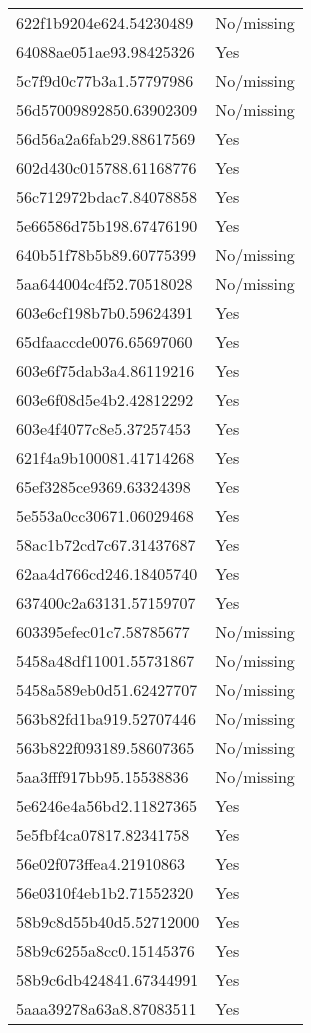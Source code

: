 \begin{tabular}{ll}
622f1b9204e624.54230489 & No/missing \\
64088ae051ae93.98425326 & Yes \\
5c7f9d0c77b3a1.57797986 & No/missing \\
56d57009892850.63902309 & No/missing \\
56d56a2a6fab29.88617569 & Yes \\
602d430c015788.61168776 & Yes \\
56c712972bdac7.84078858 & Yes \\
5e66586d75b198.67476190 & Yes \\
640b51f78b5b89.60775399 & No/missing \\
5aa644004c4f52.70518028 & No/missing \\
603e6cf198b7b0.59624391 & Yes \\
65dfaaccde0076.65697060 & Yes \\
603e6f75dab3a4.86119216 & Yes \\
603e6f08d5e4b2.42812292 & Yes \\
603e4f4077c8e5.37257453 & Yes \\
621f4a9b100081.41714268 & Yes \\
65ef3285ce9369.63324398 & Yes \\
5e553a0cc30671.06029468 & Yes \\
58ac1b72cd7c67.31437687 & Yes \\
62aa4d766cd246.18405740 & Yes \\
637400c2a63131.57159707 & Yes \\
603395efec01c7.58785677 & No/missing \\
5458a48df11001.55731867 & No/missing \\
5458a589eb0d51.62427707 & No/missing \\
563b82fd1ba919.52707446 & No/missing \\
563b822f093189.58607365 & No/missing \\
5aa3fff917bb95.15538836 & No/missing \\
5e6246e4a56bd2.11827365 & Yes \\
5e5fbf4ca07817.82341758 & Yes \\
56e02f073ffea4.21910863 & Yes \\
56e0310f4eb1b2.71552320 & Yes \\
58b9c8d55b40d5.52712000 & Yes \\
58b9c6255a8cc0.15145376 & Yes \\
58b9c6db424841.67344991 & Yes \\
5aaa39278a63a8.87083511 & Yes \\

\end{tabular}
